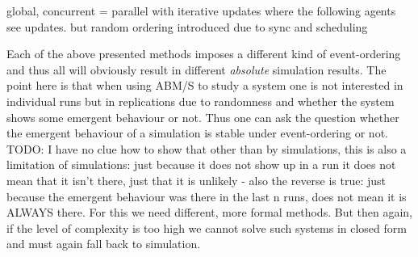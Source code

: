 global, concurrent = parallel with iterative updates where the following agents see updates. but random ordering introduced due to sync and scheduling

Each of the above presented methods imposes a different kind of event-ordering and thus all will obviously result in different \textit{absolute} simulation results. The point here is that when using ABM/S to study a system one is not interested in individual runs but in replications due to randomness and whether the system shows some emergent behaviour or not. Thus one can ask the question whether the emergent behaviour of a simulation is stable under event-ordering or not. TODO: I have no clue how to show that other than by simulations, this is also a limitation of simulations: just because it does not show up in a run it does not mean that it isn't there, just that it is unlikely - also the reverse is true: just because the emergent behaviour was there in the last n runs, does not mean it is ALWAYS there. For this we need different, more formal methods. But then again, if the level of complexity is too high we cannot solve such systems in closed form and must again fall back to simulation.